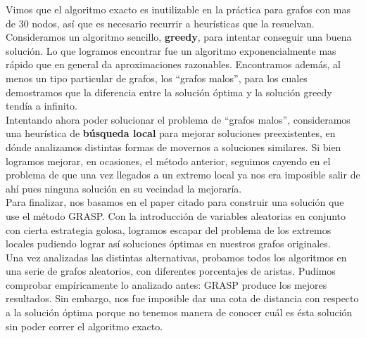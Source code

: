 Vimos que el algoritmo exacto es inutilizable en la práctica para grafos con mas de 30 nodos, así que es necesario recurrir a heurísticas que la resuelvan. \\

Consideramos un algoritmo sencillo, \textbf{greedy}, para intentar conseguir una buena solución. Lo que logramos encontrar fue un algoritmo exponencialmente mas rápido que en general da aproximaciones razonables. Encontramos además, al menos un tipo particular de grafos, los ``grafos malos'', para los cuales demostramos que la diferencia entre la solución óptima y la solución greedy tendía a infinito. \\

Intentando ahora poder solucionar el problema de ``grafos malos'', consideramos una heurística de \textbf{búsqueda local} para mejorar soluciones preexistentes, en dónde analizamos distintas formas de movernos a soluciones similares. Si bien logramos mejorar, en ocasiones, el método anterior, seguimos cayendo en el problema de que una vez llegados a un extremo local ya nos era imposible salir de ahí pues ninguna solución en su vecindad la mejoraría. \\

Para finalizar, nos basamos en el paper citado \cite{paper_grasp} para construir una solución que use el método GRASP. Con la introducción de variables aleatorias en conjunto con cierta estrategia golosa, logramos escapar del problema de los extremos locales pudiendo lograr así soluciones óptimas en nuestros grafos originales.  \\

Una vez analizadas las distintas alternativas, probamos todos los algoritmos en una serie de grafos aleatorios, con diferentes porcentajes de aristas. Pudimos comprobar empíricamente lo analizado antes: GRASP produce los mejores resultados. Sin embargo, nos fue imposible dar una cota de distancia con respecto a la solución óptima porque no tenemos manera de conocer cuál es ésta solución sin poder correr el algoritmo exacto. \\
